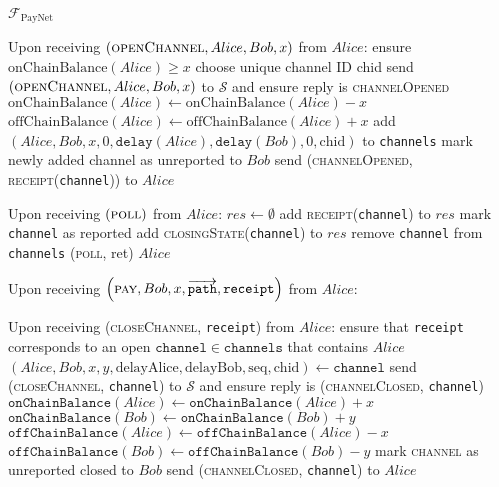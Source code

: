 \begin{functionality}{$\mathcal{F}_{\mathrm{PayNet}}$}
\begin{algorithmic}[1]
    \State Upon receiving $\left(\textsc{openChannel}, Alice, Bob, x\right)$
    from $Alice$:
    \Indent
      \State ensure $\mathrm{onChainBalance}\left(Alice\right) \geq x$
      \State choose unique channel ID chid
      \State send $\left(\textsc{openChannel}, Alice, Bob, x\right)$ to
      $\mathcal{S}$ and ensure reply is \textsc{channelOpened} %
      \State $\mathrm{onChainBalance}\left(Alice\right) \gets
      \mathrm{onChainBalance}\left(Alice\right) - x$
      \State $\mathrm{offChainBalance}\left(Alice\right) \gets
      \mathrm{offChainBalance}\left(Alice\right) + x$
      \State add $\left(Alice, Bob, x, 0, \mathtt{delay}\left(Alice\right),
      \mathtt{delay}\left(Bob\right), 0, \mathrm{chid}\right)$ to
      \texttt{channels}
      \State mark newly added channel as unreported to $Bob$
      \State send (\textsc{channelOpened}, \textsc{receipt}(\texttt{channel}))
      to $Alice$
    \EndIndent
    \State

    \State Upon receiving $\left(\textsc{poll}\right)$ from $Alice$:
    \Indent
      \State $res \gets \emptyset$
        \State add \textsc{receipt}(\texttt{channel}) to $res$
        \State mark \texttt{channel} as reported
      \EndFor
        \State add \textsc{closingState}(\texttt{channel}) to $res$
        \State remove \texttt{channel} from \texttt{channels}
      \EndFor
      \State \Return (\textsc{poll}, ret) $Alice$
    \EndIndent

    \State Upon receiving $\left(\textsc{pay}, Bob, x,
    \overrightarrow{\mathtt{path}}, \mathtt{receipt}\right)$ from $Alice$:
    \Indent
    \EndIndent
    \State

    \State Upon receiving (\textsc{closeChannel}, \texttt{receipt}) from $Alice$:
    \Indent
      \State ensure that \texttt{receipt} corresponds to an open
      $\mathtt{channel} \in \mathtt{channels}$ that contains $Alice$
      \State $\left(Alice, Bob, x, y, \mathrm{delayAlice}, \mathrm{delayBob},
      \mathrm{seq}, \mathrm{chid}\right) \gets \mathtt{channel}$ 
      \State send (\textsc{closeChannel}, \texttt{channel}) to $\mathcal{S}$ and
      ensure reply is (\textsc{channelClosed}, \texttt{channel})%
      \State $\mathtt{onChainBalance}\left(Alice\right) \gets
      \mathtt{onChainBalance}\left(Alice\right) + x$
      \State $\mathtt{onChainBalance}\left(Bob\right) \gets
      \mathtt{onChainBalance}\left(Bob\right) + y$
      \State $\mathtt{offChainBalance}\left(Alice\right) \gets
      \mathtt{offChainBalance}\left(Alice\right) - x$
      \State $\mathtt{offChainBalance}\left(Bob\right) \gets
      \mathtt{offChainBalance}\left(Bob\right) - y$
      \State mark \textsc{channel} as unreported closed to $Bob$
      \State send (\textsc{channelClosed}, \texttt{channel}) to $Alice$
    \EndIndent
  \end{algorithmic}
\end{functionality}
